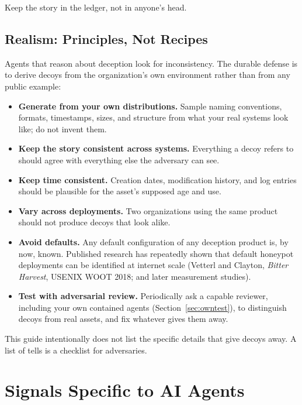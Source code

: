 \documentclass[11pt,letterpaper]{article}
\begin{document}
Keep the story in the ledger, not in anyone's head.

\subsection{Realism: Principles, Not Recipes}
\label{sec:realism}

Agents that reason about deception look for inconsistency. The durable defense is to derive decoys from the organization's own environment rather than from any public example:

\begin{itemize}
  \item \textbf{Generate from your own distributions.} Sample naming conventions, formats, timestamps, sizes, and structure from what your real systems look like; do not invent them.
  \item \textbf{Keep the story consistent across systems.} Everything a decoy refers to should agree with everything else the adversary can see.
  \item \textbf{Keep time consistent.} Creation dates, modification history, and log entries should be plausible for the asset's supposed age and use.
  \item \textbf{Vary across deployments.} Two organizations using the same product should not produce decoys that look alike.
  \item \textbf{Avoid defaults.} Any default configuration of any deception product is, by now, known. Published research has repeatedly shown that default honeypot deployments can be identified at internet scale (Vetterl and Clayton, \emph{Bitter Harvest}, USENIX WOOT 2018; and later measurement studies).
  \item \textbf{Test with adversarial review.} Periodically ask a capable reviewer, including your own contained agents (Section~\ref{sec:owntest}), to distinguish decoys from real assets, and fix whatever gives them away.
\end{itemize}

\begin{notebox}
This guide intentionally does not list the specific details that give decoys away. A list of tells is a checklist for adversaries.
\end{notebox}

\section{Signals Specific to AI Agents}
\label{sec:signals}
\end{document}
